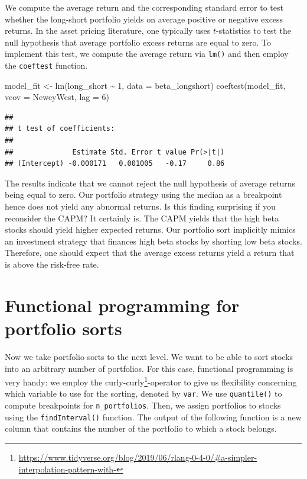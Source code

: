 \documentclass[
]{krantz}
\newenvironment{Shaded}{\begin{snugshade}}{\end{snugshade}}
\newcommand{\AttributeTok}[1]{\textcolor[rgb]{0.61,0.61,0.61}{#1}}
\newcommand{\DecValTok}[1]{\textcolor[rgb]{0.06,0.06,0.06}{#1}}
\newcommand{\FunctionTok}[1]{\textcolor[rgb]{0,0,0}{#1}}
\newcommand{\NormalTok}[1]{#1}
\newcommand{\OtherTok}[1]{\textcolor[rgb]{0.37,0.37,0.37}{#1}}
\newcommand{\SpecialCharTok}[1]{\textcolor[rgb]{0,0,0}{#1}}
\renewcommand{\href}[2]{#2\footnote{\url{#1}}}
\begin{document}
We compute the average return and the corresponding standard error to test whether the long-short portfolio yields on average positive or negative excess returns. In the asset pricing literature, one typically uses \citet{Newey1987} \(t\)-statistics to test the null hypothesis that average portfolio excess returns are equal to zero. To implement this test, we compute the average return via \texttt{lm()} and then employ the \texttt{coeftest} function.

\begin{Shaded}
\begin{Highlighting}[]
\NormalTok{model\_fit }\OtherTok{\textless{}{-}} \FunctionTok{lm}\NormalTok{(long\_short }\SpecialCharTok{\textasciitilde{}} \DecValTok{1}\NormalTok{, }\AttributeTok{data =}\NormalTok{ beta\_longshort)}
\FunctionTok{coeftest}\NormalTok{(model\_fit, }\AttributeTok{vcov =}\NormalTok{ NeweyWest, }\AttributeTok{lag =} \DecValTok{6}\NormalTok{)}
\end{Highlighting}
\end{Shaded}

\begin{verbatim}
## 
## t test of coefficients:
## 
##              Estimate Std. Error t value Pr(>|t|)
## (Intercept) -0.000171   0.001005   -0.17     0.86
\end{verbatim}

The results indicate that we cannot reject the null hypothesis of average returns being equal to zero. Our portfolio strategy using the median as a breakpoint hence does not yield any abnormal returns. Is this finding surprising if you reconsider the CAPM? It certainly is. The CAPM yields that the high beta stocks should yield higher expected returns. Our portfolio sort implicitly mimics an investment strategy that finances high beta stocks by shorting low beta stocks. Therefore, one should expect that the average excess returns yield a return that is above the risk-free rate.

\hypertarget{functional-programming-for-portfolio-sorts}{%
\section{Functional programming for portfolio sorts}\label{functional-programming-for-portfolio-sorts}}

Now we take portfolio sorts to the next level. We want to be able to sort stocks into an arbitrary number of portfolios. For this case, functional programming is very handy: we employ the \href{https://www.tidyverse.org/blog/2019/06/rlang-0-4-0/\#a-simpler-interpolation-pattern-with-}{curly-curly}-operator to give us flexibility concerning which variable to use for the sorting, denoted by \texttt{var}. We use \texttt{quantile()} to compute breakpoints for \texttt{n\_portfolios}. Then, we assign portfolios to stocks using the \texttt{findInterval()} function. The output of the following function is a new column that contains the number of the portfolio to which a stock belongs.
\end{document}
